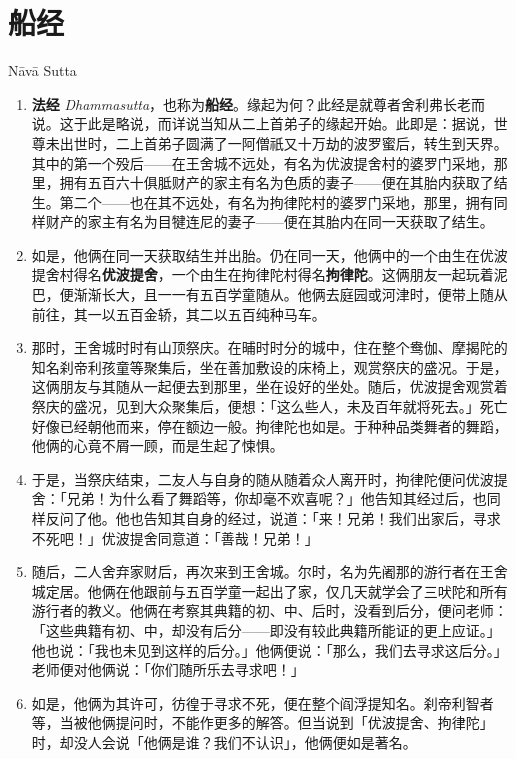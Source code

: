 \section{船经}

\begin{center}Nāvā Sutta\end{center}\vspace{1em}

\begin{enumerate}\item \textbf{法经} \textit{Dhammasutta}，也称为\textbf{船经}。缘起为何？此经是就尊者舍利弗长老而说。这于此是略说，而详说当知从二上首弟子的缘起开始。此即是：据说，世尊未出世时，二上首弟子圆满了一阿僧祇又十万劫的波罗蜜后，转生到天界。其中的第一个殁后——在王舍城不远处，有名为优波提舍村的婆罗门采地，那里，拥有五百六十俱胝财产的家主有名为色质的妻子——便在其胎内获取了结生。第二个——也在其不远处，有名为拘律陀村的婆罗门采地，那里，拥有同样财产的家主有名为目犍连尼的妻子——便在其胎内在同一天获取了结生。
\item 如是，他俩在同一天获取结生并出胎。仍在同一天，他俩中的一个由生在优波提舍村得名\textbf{优波提舍}，一个由生在拘律陀村得名\textbf{拘律陀}。这俩朋友一起玩着泥巴，便渐渐长大，且一一有五百学童随从。他俩去庭园或河津时，便带上随从前往，其一以五百金轿，其二以五百纯种马车。
\item 那时，王舍城时时有山顶祭庆。在晡时时分的城中，住在整个鸯伽、摩揭陀的知名刹帝利孩童等聚集后，坐在善加敷设的床椅上，观赏祭庆的盛况。于是，这俩朋友与其随从一起便去到那里，坐在设好的坐处。随后，优波提舍观赏着祭庆的盛况，见到大众聚集后，便想：「这么些人，未及百年就将死去。」死亡好像已经朝他而来，停在额边一般。拘律陀也如是。于种种品类舞者的舞蹈，他俩的心竟不屑一顾，而是生起了悚惧。
\item 于是，当祭庆结束，二友人与自身的随从随着众人离开时，拘律陀便问优波提舍：「兄弟！为什么看了舞蹈等，你却毫不欢喜呢？」他告知其经过后，也同样反问了他。他也告知其自身的经过，说道：「来！兄弟！我们出家后，寻求不死吧！」优波提舍同意道：「善哉！兄弟！」
\item 随后，二人舍弃家财后，再次来到王舍城。尔时，名为先阇那的游行者在王舍城定居。他俩在他跟前与五百学童一起出了家，仅几天就学会了三吠陀和所有游行者的教义。他俩在考察其典籍的初、中、后时，没看到后分，便问老师：「这些典籍有初、中，却没有后分——即没有较此典籍所能证的更上应证。」他也说：「我也未见到这样的后分。」他俩便说：「那么，我们去寻求这后分。」老师便对他俩说：「你们随所乐去寻求吧！」
\item 如是，他俩为其许可，彷徨于寻求不死，便在整个阎浮提知名。刹帝利智者等，当被他俩提问时，不能作更多的解答。但当说到「优波提舍、拘律陀」时，却没人会说「他俩是谁？我们不认识」，他俩便如是著名。

\end{enumerate}
